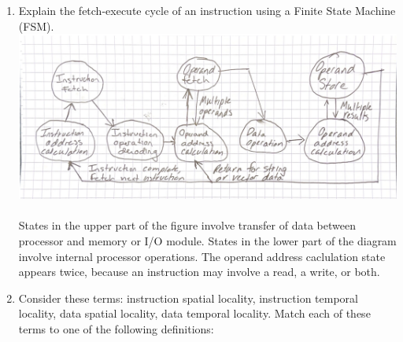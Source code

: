 \documentclass{article}
\begin{document}
\begin{enumerate}
    \pagebreak
    \item Explain the fetch-execute cycle of an instruction using a Finite State Machine (FSM).
    \centering
    \includegraphics[width=\textwidth]{fsm.png} %
    \raggedright
    \paragraph{} States in the upper part of the figure involve transfer of data between processor and memory or I/O
    module. States in the lower part of the diagram involve internal processor operations.
    The operand address caclulation state appears twice, because an instruction may involve a read, a write, or both.
    
    \pagebreak
    \item Consider these terms: instruction spatial locality, instruction temporal locality, data spatial
    locality, data temporal locality. Match each of these terms to one of the following definitions:


\end{enumerate}
\end{document}
